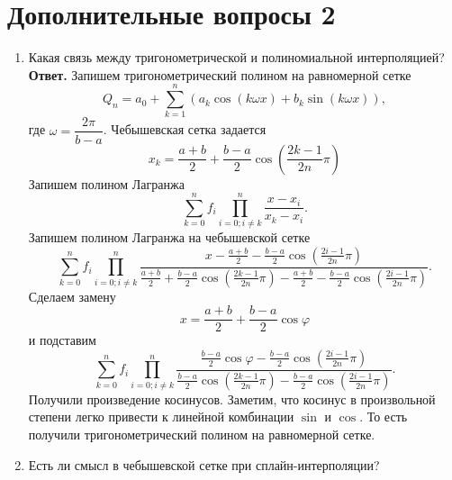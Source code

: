 \documentclass{article}
\begin{document}
    \newpage

    \section{Дополнительные вопросы 2}
    \begin{enumerate}
        \item Какая связь между тригонометрической и полиномиальной интерполяцией?
        \newline
        {\bfseries Ответ. } 
        Запишем тригонометрический полином на равномерной сетке 
        \begin{equation*}
            Q_n = a_0 + \sum_{k=1}^{n} (a_k \cos (k \omega x) + b_k \sin (k \omega x)),
        \end{equation*}
        где $\omega = \dfrac{2 \pi}{b-a}$.
        Чебышевская сетка задается 
        \begin{equation*}
            x_k = \frac{a+b}{2} + \frac{b-a}{2} \cos (\frac{2k-1}{2n} \pi)
        \end{equation*}
        Запишем полином Лагранжа 
        \begin{equation*}
            \sum_{k=0}^{n} f_i \prod_{i=0;i\neq k}^{n} \dfrac{x-x_i}{x_k - x_i}.
        \end{equation*}
        Запишем полином Лагранжа на чебышевской сетке 
        \begin{equation*}
            \sum_{k=0}^{n} f_i \prod_{i=0;i\neq k}^{n} \dfrac{x-\frac{a+b}{2} - \frac{b-a}{2} \cos (\frac{2i-1}{2n} \pi)}{\frac{a+b}{2} + \frac{b-a}{2} \cos (\frac{2k-1}{2n} \pi) -\frac{a+b}{2} - \frac{b-a}{2} \cos (\frac{2i-1}{2n} \pi)}.
        \end{equation*}
        Сделаем замену 
        \begin{equation*}
            x = \frac{a+b}{2} + \frac{b-a}{2} \cos \varphi
        \end{equation*}
        и подставим
        \begin{equation*}
            \sum_{k=0}^{n} f_i \prod_{i=0;i\neq k}^{n} \dfrac{ \frac{b-a}{2} \cos \varphi - \frac{b-a}{2} \cos (\frac{2i-1}{2n} \pi)}{\frac{b-a}{2} \cos (\frac{2k-1}{2n} \pi)  - \frac{b-a}{2} \cos (\frac{2i-1}{2n} \pi)}.
        \end{equation*}
        Получили произведение косинусов. Заметим, что косинус в произвольной степени легко привести к линейной комбинации $\sin$ и $\cos$. То есть получили тригонометрический полином на равномерной сетке.
        \item Есть ли смысл в чебышевской сетке при сплайн-интерполяции?

\end{enumerate}
\end{document}
